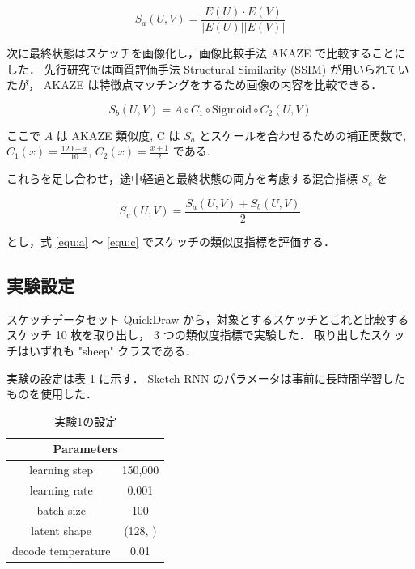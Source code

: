 \documentclass[twocolumn]{jarticle}     %
\begin{document}
\begin{equation}
  \label{equ:a}
  S_a(U, V) = \frac{E(U) \cdot E(V)}{|E(U)| |E(V)|}
\end{equation}


次に最終状態はスケッチを画像化し，画像比較手法 AKAZE で比較することにした．
先行研究では画質評価手法 Structural Similarity (SSIM) が用いられていたが，
AKAZE は特徴点マッチングをするため画像の内容を比較できる．

\begin{equation}
  \label{equ:b}
  S_b(U, V) = A \circ C_1 \circ \mathrm{Sigmoid} \circ C_2 (U, V)
\end{equation}

ここで $A$ は AKAZE 類似度, C は $S_a$ とスケールを合わせるための補正関数で, $C_1(x) = \frac{120 - x}{10}$, $C_2(x) = \frac{x + 1}{2}$ である.


これらを足し合わせ，途中経過と最終状態の両方を考慮する混合指標 $S_c$ を

\begin{equation}
  \label{equ:c}
  S_c(U, V) = \frac{S_a(U, V) + S_b(U, V)}{2}
\end{equation}

とし，式 \ref{equ:a} ～ \ref{equ:c} でスケッチの類似度指標を評価する．

\subsection{実験設定}
スケッチデータセット QuickDraw から，対象とするスケッチとこれと比較するスケッチ 10 枚を取り出し，
3 つの類似度指標で実験した．
取り出したスケッチはいずれも "sheep" クラスである．

実験の設定は表 \ref{tab:setting1} に示す．
Sketch RNN のパラメータは事前に長時間学習したものを使用した．

\begin{table}[tb]
  \begin{center}
    \caption{実験1の設定}
    \begin{tabular}{|c|c|} \hline
      \multicolumn{2}{|c|}{Parameters}  \\ \hline
      learning step & 150,000 \\ \hline
      learning rate & 0.001 \\ \hline
      batch size & 100 \\ \hline
      latent shape & (128, ) \\ \hline
      decode temperature & 0.01 \\ \hline
    \end{tabular}
    \label{tab:setting1}
  \end{center}
\end{table}
\end{document}
